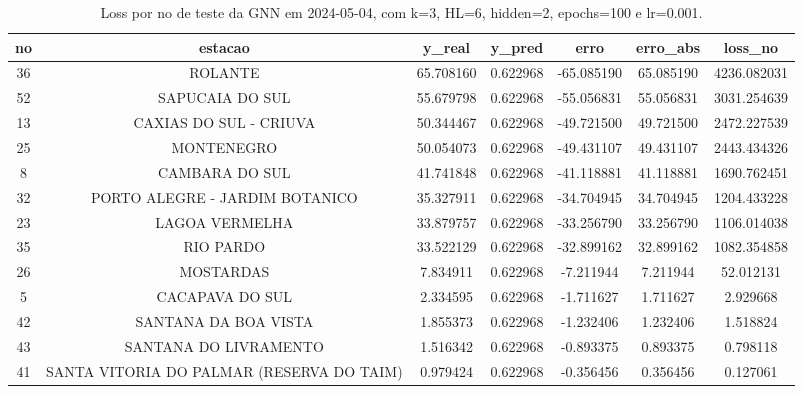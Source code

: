 \begin{table}[h]
\centering
\caption{Loss por no de teste da GNN em 2024-05-04, com k=3, HL=6, hidden=2, epochs=100 e lr=0.001.}
\label{tab:gnn_loss_k3_hl6_h2_e100_d20240504}
\begin{tabular}{ccccccc}
\toprule
no & estacao & y\_real & y\_pred & erro & erro\_abs & loss\_no \\
\midrule
36 & ROLANTE & 65.708160 & 0.622968 & -65.085190 & 65.085190 & 4236.082031 \\
52 & SAPUCAIA DO SUL & 55.679798 & 0.622968 & -55.056831 & 55.056831 & 3031.254639 \\
13 & CAXIAS DO SUL - CRIUVA & 50.344467 & 0.622968 & -49.721500 & 49.721500 & 2472.227539 \\
25 & MONTENEGRO & 50.054073 & 0.622968 & -49.431107 & 49.431107 & 2443.434326 \\
8 & CAMBARA DO SUL & 41.741848 & 0.622968 & -41.118881 & 41.118881 & 1690.762451 \\
32 & PORTO ALEGRE - JARDIM BOTANICO & 35.327911 & 0.622968 & -34.704945 & 34.704945 & 1204.433228 \\
23 & LAGOA VERMELHA & 33.879757 & 0.622968 & -33.256790 & 33.256790 & 1106.014038 \\
35 & RIO PARDO & 33.522129 & 0.622968 & -32.899162 & 32.899162 & 1082.354858 \\
26 & MOSTARDAS & 7.834911 & 0.622968 & -7.211944 & 7.211944 & 52.012131 \\
5 & CACAPAVA DO SUL & 2.334595 & 0.622968 & -1.711627 & 1.711627 & 2.929668 \\
42 & SANTANA DA BOA VISTA & 1.855373 & 0.622968 & -1.232406 & 1.232406 & 1.518824 \\
43 & SANTANA DO LIVRAMENTO & 1.516342 & 0.622968 & -0.893375 & 0.893375 & 0.798118 \\
41 & SANTA VITORIA DO PALMAR (RESERVA DO TAIM) & 0.979424 & 0.622968 & -0.356456 & 0.356456 & 0.127061 \\
\bottomrule
\end{tabular}
\end{table}

